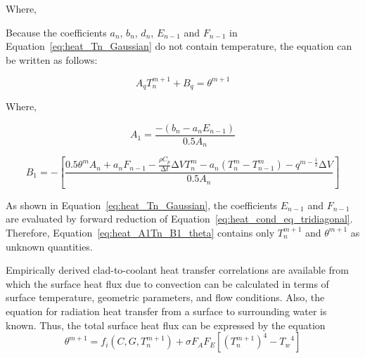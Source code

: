 Where,

Because the coefficients $a_{n}$, $b_{n}$, $d_{n}$, $E_{n - 1}$ and $F_{n - 1}$ in
Equation~\ref{eq:heat_Tn_Gaussian} do not contain temperature, the equation can be written as
follows:

\begin{equation}
    \label{eq:heat_A1Tn_B1_theta}
    A_{q}T_{n}^{m + 1} + B_{q} = \theta^{m + 1}
\end{equation}

Where,

\begin{equation}
    \label{eq:heat_A1}
    A_{1} = \frac{- \left( b_{n} - a_{n}E_{n - 1} \right)}{0.5A_{n}}
\end{equation}

\begin{equation}
    \label{eq:heat_B1}
    B_{1} = - \left\lbrack \frac{0.5\theta^{m}A_{n} + a_{n}F_{n - 1} - \frac{\rho C_{p}}{\mathrm{\Delta}t}\mathrm{\Delta}VT_{n}^{m} - a_{n}\left( T_{n}^{m} - T_{n - 1}^{m} \right) - q^{m - \frac{1}{2}}\mathrm{\Delta}V}{0.5A_{n}} \right\rbrack
\end{equation}

As shown in Equation~\ref{eq:heat_Tn_Gaussian}, the coefficients $E_{n - 1}$ and $F_{n - 1}$ are
evaluated by forward reduction of Equation~\ref{eq:heat_cond_eq_tridiagonal}.  Therefore,
Equation~\ref{eq:heat_A1Tn_B1_theta} contains only $T_{n}^{m + 1}$ and $\theta^{m + 1}$ as unknown
quantities.

Empirically derived clad-to-coolant heat transfer correlations are available from which the surface
heat flux due to convection can be calculated in terms of surface temperature, geometric parameters,
and flow conditions. Also, the equation for radiation heat transfer from a surface to surrounding
water is known. Thus, the total surface heat flux can be expressed by the equation
\begin{equation}
    \label{eq:heat_theta_m1}
    \theta^{m + 1} = f_{i}\left( C,G,T_{n}^{m + 1} \right) + \sigma F_{A}F_{E}\left\lbrack {(T_{n}^{m + 1})}^{4} - {T_{w}}^{4} \right\rbrack
\end{equation}

